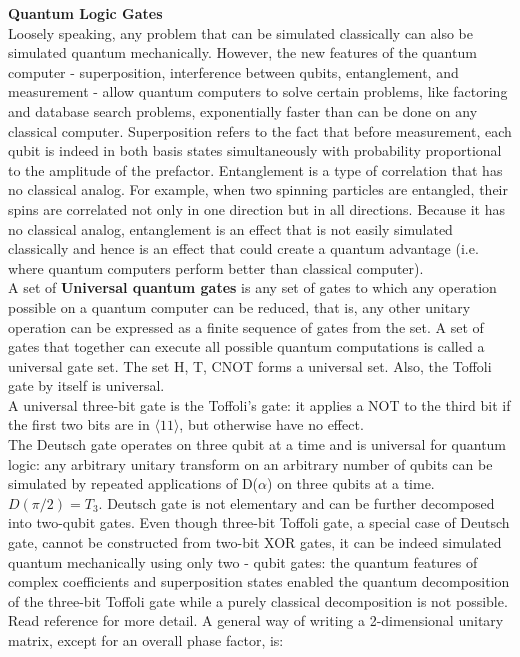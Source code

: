 \documentclass{article}
\begin{document}
\textbf{Quantum Logic Gates} \\

Loosely speaking, any problem that can be simulated classically can also be simulated quantum mechanically. However, the new features of the quantum computer - superposition, interference between qubits, entanglement, and measurement - allow quantum computers to solve certain problems, like factoring and database search problems, exponentially faster than can be done on any classical computer. Superposition refers to the fact that before measurement, each qubit is indeed in both basis states simultaneously with probability proportional to the amplitude of the prefactor. Entanglement is a type of correlation that has no classical analog. For example, when two spinning particles are entangled, their spins are correlated not only in one direction but in all directions. Because it has no classical analog, entanglement is an effect that is not easily simulated classically and hence is an effect that could create a quantum advantage (i.e. where quantum computers perform better than classical computer). \\

A set of \textbf{Universal quantum gates} is any set of gates to which any operation possible on a quantum computer can be reduced, that is, any other unitary operation can be expressed as a finite sequence of gates from the set. A set of gates that together can execute all possible quantum computations is called a universal gate set. The set {H, T, CNOT} forms a universal set. Also, the Toffoli gate by itself is universal. \\

A universal three-bit gate is the Toffoli's gate: it applies a NOT to the third bit if the first two bits are in $\langle 11 \rangle$, but otherwise have no effect. \\

The Deutsch gate operates on three qubit at a time and is universal for quantum logic: any arbitrary unitary transform on an arbitrary number of qubits can be simulated by repeated applications of D($\alpha$) on three qubits at a time. $D(\pi/2) = T_3$. Deutsch gate is not elementary and can be further decomposed into two-qubit gates. Even though three-bit Toffoli gate, a special case of Deutsch gate, cannot be constructed from two-bit XOR gates, it can be indeed simulated quantum mechanically using only two - qubit gates: the quantum features of complex coefficients and superposition states enabled the quantum decomposition of the three-bit Toffoli gate while a purely classical decomposition is not possible. Read reference for more detail. A general way of writing a 2-dimensional unitary matrix, except for an overall phase factor, is: \\
\end{document}
